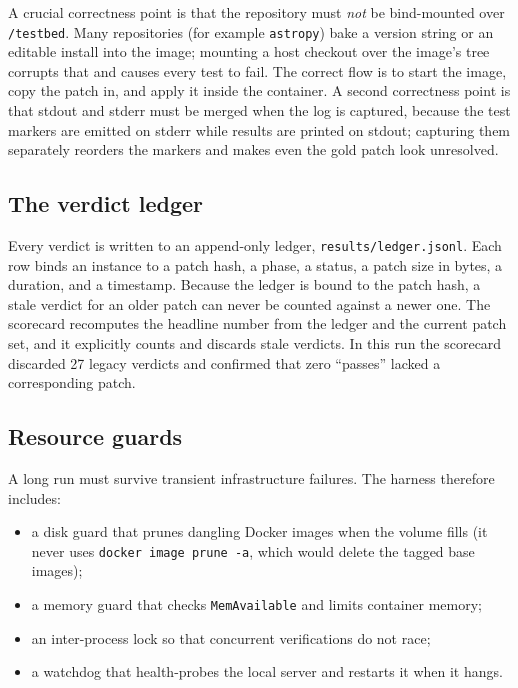 \documentclass[11pt,a4paper]{article}
\begin{document}
A crucial correctness point is that the repository must \emph{not} be bind-mounted over
\texttt{/testbed}. Many repositories (for example \texttt{astropy}) bake a
version string or an editable install into the image; mounting a host checkout over the
image's tree corrupts that and causes every test to fail. The correct flow is to start
the image, copy the patch in, and apply it inside the container. A second correctness
point is that stdout and stderr must be merged when the log is captured, because the test
markers are emitted on stderr while results are printed on stdout; capturing them
separately reorders the markers and makes even the gold patch look unresolved.

\subsection{The verdict ledger}

Every verdict is written to an append-only ledger,
\texttt{results/ledger.jsonl}. Each row binds an instance to a patch hash, a phase, a
status, a patch size in bytes, a duration, and a timestamp. Because the ledger is bound
to the patch hash, a stale verdict for an older patch can never be counted against a
newer one. The scorecard recomputes the headline number from the ledger and the current
patch set, and it explicitly counts and discards stale verdicts. In this run the
scorecard discarded 27 legacy verdicts and confirmed that zero ``passes'' lacked a
corresponding patch.

\subsection{Resource guards}

A long run must survive transient infrastructure failures. The harness therefore
includes:

\begin{itemize}[leftmargin=1.4em]
  \item a disk guard that prunes dangling Docker images when the volume fills (it never
  uses \texttt{docker image prune -a}, which would delete the tagged base images);
  \item a memory guard that checks \texttt{MemAvailable} and limits container memory;
  \item an inter-process lock so that concurrent verifications do not race;
  \item a watchdog that health-probes the local server and restarts it when it hangs.
\end{itemize}
\end{document}
